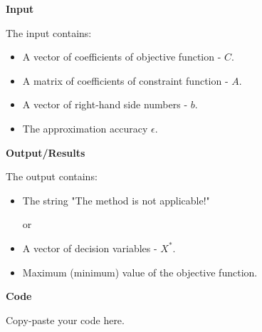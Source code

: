 \documentclass[12pt, legalpaper]{exam}
\begin{document}
\noindent     \textbf{Input}

\vspace{12pt}
The input contains:
\begin{itemize}
    \item A vector of coefficients of objective function - $C$.
    \item A matrix of coefficients of constraint function - $A$.
    \item A vector of right-hand side numbers - $b$.
    \item The approximation accuracy $\epsilon$.
\end{itemize}

\vspace{12pt}
\noindent     \textbf{Output/Results}

The output contains:
\begin{itemize}
    \item The string "The method is not applicable!"
    
or

    \item A vector of decision variables - $X^*$.
    \item Maximum (minimum) value of the objective function.
\end{itemize}

\noindent
{}




\vspace{24pt}
\noindent     \textbf{Code}

Copy-paste your code here.
\end{document}
